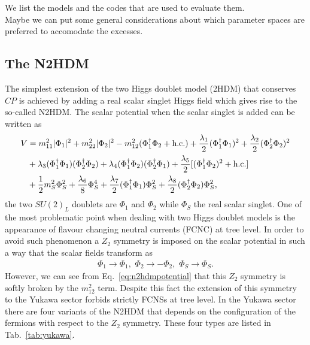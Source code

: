 \documentclass[12pt]{article}
\begin{document}
\noindent
We list the models and the codes that are used to evaluate them.\\
Maybe we can put some general considerations about which parameter
spaces are preferred to accomodate the excesses.




\subsection{The N2HDM}
\label{sec:n2hdm}

The simplest extension of the two Higgs doublet model (2HDM) that conserves $CP$ is achieved by adding a real scalar singlet Higgs field which gives rise to the so-called N2HDM. The scalar potential when the scalar singlet is added can be written as \cite{Chen:2013jvg,Muhlleitner:2016mzt}
\begin{align}
V&=m_{11}^2|\Phi_1|^2 + m_{22}^2|\Phi_2|^2 -m_{12}^2(\Phi_1^\dagger\Phi_2+ \text{h.c.}) +\frac{\lambda_1}{2}(\Phi_1^\dagger\Phi_1)^2+\frac{\lambda_2}{2}(\Phi_2^\dagger\Phi_2)^2 \notag \\
&+\lambda_3 (\Phi_1^\dagger\Phi_1)(\Phi_2^\dagger\Phi_2)+ \lambda_4(\Phi_1^\dagger\Phi_2)(\Phi_2^\dagger \Phi_1)+\frac{\lambda_5}{2}[(\Phi_1^\dagger\Phi_2)^2+\text{h.c.}]\notag\\
&+\frac{1}{2}m_S^2\Phi_S^2+\frac{\lambda_6}{8}\Phi_S^4+\frac{\lambda_7}{2}(\Phi_1^\dagger\Phi_1)\Phi_S^2+\frac{\lambda_8}{2}(\Phi_2^\dagger\Phi_2)\Phi_S^2,
\label{eq:n2hdmpotential}
\end{align}
the two $SU(2)_L$ doublets are $\Phi_1$ and $\Phi_2$ while $\Phi_S$ the real scalar singlet. One of the most problematic point when dealing with two Higgs doublet models is the appearance of flavour changing neutral currents (FCNC) at tree level. In order to avoid such phenomenon a $Z_2$ symmetry is imposed on the scalar potential in such a way that the scalar fields transform as
\begin{align}
\Phi_1\to\Phi_1,\,\, \Phi_2\to-\Phi_2,\,\, \Phi_S\to \Phi_S.
\end{align}
However, we can see from Eq.~\eqref{eq:n2hdmpotential} that this $Z_2$ symmetry is softly broken by the $m_{12}^2$ term. Despite this fact the extension of this symmetry to the Yukawa sector forbids strictly FCNSs at tree level.
In the Yukawa sector there are four variants of the N2HDM that depends on the configuration of the fermions with respect to the $Z_2$ symmetry. These four types are listed in Tab.~\ref{tab:yukawa}.
\end{document}

